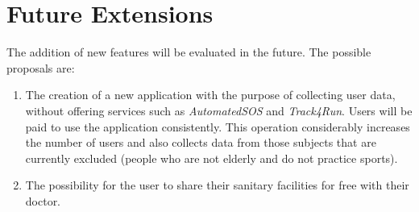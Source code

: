\section{Future Extensions}
The addition of new features will be evaluated in the future. The possible proposals are:
\begin{enumerate}
  \item The creation of a new application with the purpose of collecting user data, without offering services such as \textit{AutomatedSOS} and \textit{Track4Run}. Users will be paid to use the application consistently. This operation considerably increases the number of users and also collects data from those subjects that are currently excluded (people who are not elderly and do not practice sports).
  \item The possibility for the user to share their sanitary facilities for free with their doctor.
\end{enumerate}
